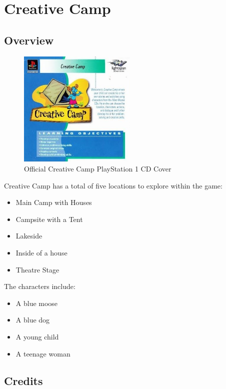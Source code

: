 \chapter{Creative Camp}

\section{Overview}

\begin{figure}[H]
    \centering
    \includegraphics[width=0.5\textwidth]{"./Games/Creative/Images/CreativeCampCDCover.jpg"}
    \caption{Official Creative Camp PlayStation 1 CD Cover}
\end{figure}

Creative Camp has a total of five locations to explore within the game:

\begin{itemize}
    \item Main Camp with Houses
    \item Campsite with a Tent
    \item Lakeside
    \item Inside of a house
    \item Theatre Stage
\end{itemize}

The characters include:
\begin{itemize}
    \item A blue moose
    \item A blue dog
    \item A young child
    \item A teenage woman
\end{itemize}

\section{Credits}

